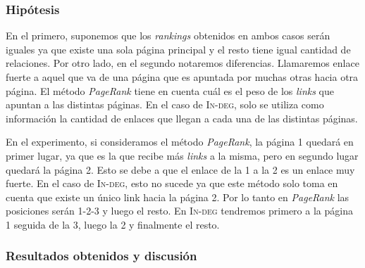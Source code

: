             \subsubsection*{Hipótesis}

            En el primero, suponemos que los \emph{rankings} obtenidos en ambos casos serán iguales ya que existe una sola página principal y el resto tiene igual cantidad de relaciones. Por otro lado, en el segundo notaremos diferencias. Llamaremos enlace fuerte a aquel que va de una página que es apuntada por muchas otras hacia otra página. El método \emph{PageRank} tiene en cuenta cuál es el peso de los \emph{links} que apuntan a las distintas páginas. En el caso de \textsc{In-deg}, solo se utiliza como información la cantidad de enlaces que llegan a cada una de las distintas páginas.

            En el experimento, si consideramos el método \emph{PageRank}, la página 1 quedará en primer lugar, ya que es la que recibe más \emph{links} a la misma, pero en segundo lugar quedará la página 2. Esto se debe a que el enlace de la 1 a la 2 es un enlace muy fuerte. En el caso de \textsc{In-deg}, esto no sucede ya que este método solo toma en cuenta que existe un único link hacia la página 2. Por lo tanto en \emph{PageRank} las posiciones serán 1-2-3 y luego el resto. En \textsc{In-deg} tendremos primero a la página 1 seguida de la 3, luego la 2 y finalmente el resto.

            \subsubsection*{Resultados obtenidos y discusión}


